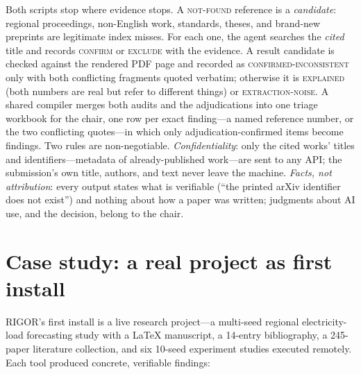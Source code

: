 \documentclass[11pt]{article}
\begin{document}
Both scripts stop where evidence stops. A \textsc{not-found} reference is a
\emph{candidate}: regional proceedings, non-English work, standards, theses,
and brand-new preprints are legitimate index misses. For each one, the agent
searches the \emph{cited} title and records \textsc{confirm} or
\textsc{exclude} with the evidence. A result candidate is checked against the
rendered PDF page and recorded as \textsc{confirmed-inconsistent} only with
both conflicting fragments quoted verbatim; otherwise it is \textsc{explained}
(both numbers are real but refer to different things) or
\textsc{extraction-noise}. A shared compiler merges both audits and the
adjudications into one triage workbook for the chair, one row per exact
finding---a named reference number, or the two conflicting quotes---in which
only adjudication-confirmed items become findings. Two rules are
non-negotiable. \emph{Confidentiality}: only the cited works' titles and
identifiers---metadata of already-published work---are sent to any API; the
submission's own title, authors, and text never leave the machine.
\emph{Facts, not attribution}: every output states what is verifiable (``the
printed arXiv identifier does not exist'') and nothing about how a paper was
written; judgments about AI use, and the decision, belong to the chair.

\section{Case study: a real project as first install}
\label{sec:case}

RIGOR's first install is a live research project---a multi-seed regional
electricity-load forecasting study with a LaTeX manuscript, a 14-entry
bibliography, a 245-paper literature collection, and six 10-seed experiment
studies executed remotely. Each tool produced concrete, verifiable findings:
\end{document}
